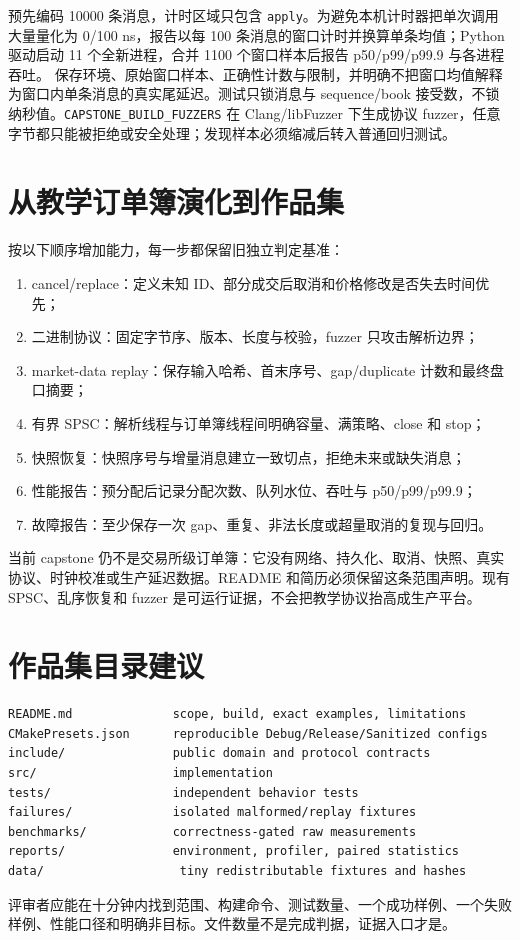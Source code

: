  预先编码 10000 条消息，计时区域只包含 \texttt{apply}。为避免本机计时器把单次调用大量量化为 0/100 ns，报告以每 100 条消息的窗口计时并换算单条均值；Python 驱动启动 11 个全新进程，合并 1100 个窗口样本后报告 p50/p99/p99.9 与各进程吞吐。 保存环境、原始窗口样本、正确性计数与限制，并明确不把窗口均值解释为窗口内单条消息的真实尾延迟。测试只锁消息与 sequence/book 接受数，不锁纳秒值。\texttt{CAPSTONE\_BUILD\_FUZZERS} 在 Clang/libFuzzer 下生成协议 fuzzer，任意字节都只能被拒绝或安全处理；发现样本必须缩减后转入普通回归测试。

\section{从教学订单簿演化到作品集}

按以下顺序增加能力，每一步都保留旧独立判定基准：

\begin{enumerate}
  \item cancel/replace：定义未知 ID、部分成交后取消和价格修改是否失去时间优先；
  \item 二进制协议：固定字节序、版本、长度与校验，fuzzer 只攻击解析边界；
  \item market-data replay：保存输入哈希、首末序号、gap/duplicate 计数和最终盘口摘要；
  \item 有界 SPSC：解析线程与订单簿线程间明确容量、满策略、close 和 stop；
  \item 快照恢复：快照序号与增量消息建立一致切点，拒绝未来或缺失消息；
  \item 性能报告：预分配后记录分配次数、队列水位、吞吐与 p50/p99/p99.9；
  \item 故障报告：至少保存一次 gap、重复、非法长度或超量取消的复现与回归。
\end{enumerate}

当前 capstone 仍不是交易所级订单簿：它没有网络、持久化、取消、快照、真实协议、时钟校准或生产延迟数据。README 和简历必须保留这条范围声明。现有 SPSC、乱序恢复和 fuzzer 是可运行证据，不会把教学协议抬高成生产平台。

\section{作品集目录建议}

\begin{lstlisting}[numbers=none]
README.md              scope, build, exact examples, limitations
CMakePresets.json      reproducible Debug/Release/Sanitized configs
include/               public domain and protocol contracts
src/                   implementation
tests/                 independent behavior tests
failures/              isolated malformed/replay fixtures
benchmarks/            correctness-gated raw measurements
reports/               environment, profiler, paired statistics
data/                   tiny redistributable fixtures and hashes
\end{lstlisting}

评审者应能在十分钟内找到范围、构建命令、测试数量、一个成功样例、一个失败样例、性能口径和明确非目标。文件数量不是完成判据，证据入口才是。
